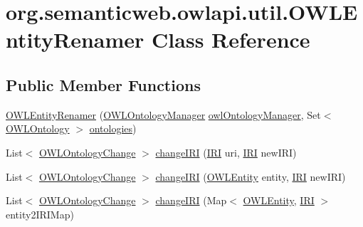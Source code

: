 \hypertarget{classorg_1_1semanticweb_1_1owlapi_1_1util_1_1_o_w_l_entity_renamer}{\section{org.\-semanticweb.\-owlapi.\-util.\-O\-W\-L\-Entity\-Renamer Class Reference}
\label{classorg_1_1semanticweb_1_1owlapi_1_1util_1_1_o_w_l_entity_renamer}
}
\subsection*{Public Member Functions}
\begin{DoxyCompactItemize}
\item 
\hyperlink{classorg_1_1semanticweb_1_1owlapi_1_1util_1_1_o_w_l_entity_renamer_aea0f22952c1ee3f4d8fa1a48b6876390}{O\-W\-L\-Entity\-Renamer} (\hyperlink{interfaceorg_1_1semanticweb_1_1owlapi_1_1model_1_1_o_w_l_ontology_manager}{O\-W\-L\-Ontology\-Manager} \hyperlink{classorg_1_1semanticweb_1_1owlapi_1_1util_1_1_o_w_l_entity_renamer_aef52bfe7ef1ea7aed6eb487eb9bd95cb}{owl\-Ontology\-Manager}, Set$<$ \hyperlink{interfaceorg_1_1semanticweb_1_1owlapi_1_1model_1_1_o_w_l_ontology}{O\-W\-L\-Ontology} $>$ \hyperlink{classorg_1_1semanticweb_1_1owlapi_1_1util_1_1_o_w_l_entity_renamer_abf2e6e75d68be5a087ef1f6a3773e497}{ontologies})
\item 
List$<$ \hyperlink{classorg_1_1semanticweb_1_1owlapi_1_1model_1_1_o_w_l_ontology_change}{O\-W\-L\-Ontology\-Change} $>$ \hyperlink{classorg_1_1semanticweb_1_1owlapi_1_1util_1_1_o_w_l_entity_renamer_aa0b6a5b1a921776d06b8f4c37a3db102}{change\-I\-R\-I} (\hyperlink{classorg_1_1semanticweb_1_1owlapi_1_1model_1_1_i_r_i}{I\-R\-I} uri, \hyperlink{classorg_1_1semanticweb_1_1owlapi_1_1model_1_1_i_r_i}{I\-R\-I} new\-I\-R\-I)
\item 
List$<$ \hyperlink{classorg_1_1semanticweb_1_1owlapi_1_1model_1_1_o_w_l_ontology_change}{O\-W\-L\-Ontology\-Change} $>$ \hyperlink{classorg_1_1semanticweb_1_1owlapi_1_1util_1_1_o_w_l_entity_renamer_a500c746b7229d3bc32a8d75b5031fa72}{change\-I\-R\-I} (\hyperlink{interfaceorg_1_1semanticweb_1_1owlapi_1_1model_1_1_o_w_l_entity}{O\-W\-L\-Entity} entity, \hyperlink{classorg_1_1semanticweb_1_1owlapi_1_1model_1_1_i_r_i}{I\-R\-I} new\-I\-R\-I)
\item 
List$<$ \hyperlink{classorg_1_1semanticweb_1_1owlapi_1_1model_1_1_o_w_l_ontology_change}{O\-W\-L\-Ontology\-Change} $>$ \hyperlink{classorg_1_1semanticweb_1_1owlapi_1_1util_1_1_o_w_l_entity_renamer_a38b940fb5c732d95438beb089aae3737}{change\-I\-R\-I} (Map$<$ \hyperlink{interfaceorg_1_1semanticweb_1_1owlapi_1_1model_1_1_o_w_l_entity}{O\-W\-L\-Entity}, \hyperlink{classorg_1_1semanticweb_1_1owlapi_1_1model_1_1_i_r_i}{I\-R\-I} $>$ entity2\-I\-R\-I\-Map)
\end{DoxyCompactItemize}
